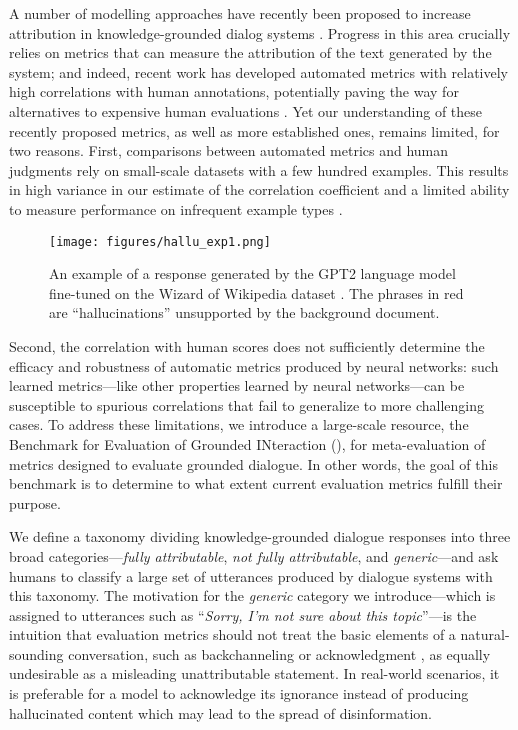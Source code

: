 A number of modelling approaches have recently been proposed to increase attribution in knowledge-grounded dialog systems \cite{ rashkin-etal-2021-increasing, shuster-etal-2021-retrieval-augmentation, dziri-etal-2021-neural, dziri2022faithdial}. Progress in this area crucially relies on metrics that can measure the attribution of the text generated by the system; and indeed, recent work  has developed automated metrics with relatively high correlations with human annotations, potentially paving the way for alternatives to expensive human evaluations \cite{honovich-etal-2021-q2, dziri-etal-2021-neural, dziri2022faithdial}. Yet our understanding of these recently proposed metrics, as well as more established ones, remains limited, for two reasons.
First, comparisons between automated metrics and human judgments rely on small-scale datasets with a few hundred examples. This results in high variance in our estimate of the correlation coefficient and a limited ability to measure performance on infrequent example types \cite{gehrmann2021gem}.
  \begin{figure}[ht]
\centering
\texttt{[image: figures/hallu\_exp1.png]}
\caption{An example of a response generated by the GPT2 language model fine-tuned on the Wizard of Wikipedia dataset \cite{dinan2018wizard}. The phrases in red are ``hallucinations'' unsupported by the background document. \label{fig:hallucination}}
\end{figure}
Second, the correlation with human scores does not sufficiently determine the efficacy and robustness of automatic metrics produced by neural networks: such learned metrics---like other properties learned by neural networks---can be susceptible to spurious correlations that fail to generalize to more challenging cases.
To address these limitations, we introduce a large-scale resource, the Benchmark for Evaluation of Grounded INteraction (\begindata),  for meta-evaluation of metrics designed to evaluate grounded dialogue. In other words, the goal of this benchmark is to determine to what extent current evaluation metrics fulfill their purpose.



We define a taxonomy dividing knowledge-grounded dialogue responses into three broad categories---\textit{fully attributable}, \textit{not fully attributable}, and \textit{generic}---and ask humans to classify a large set of utterances produced by dialogue systems with this taxonomy. The motivation for the \textit{generic} category we introduce---which is assigned to utterances such as ``\textit{Sorry, I'm not sure about this topic}''---is the intuition that evaluation metrics should not treat the basic elements of a natural-sounding conversation, such as backchanneling or acknowledgment \cite{grice1989studies, stiles1992describing, bunt-etal-2020-iso}, as equally undesirable as a misleading unattributable statement. In real-world scenarios, it is  preferable for a model to acknowledge its ignorance instead of producing hallucinated content which may lead to the spread of disinformation.
 
